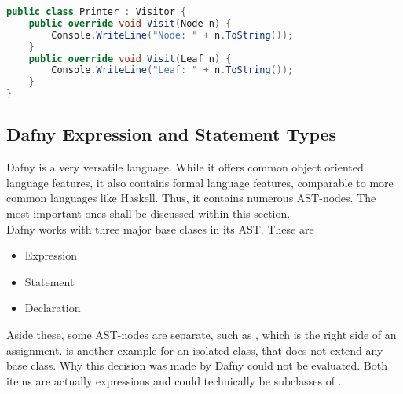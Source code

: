 \begin{lstlisting}[language=csharp, caption={Example for Visitor}, captionpos=b, label={lst:visitor}]
public class Printer : Visitor {
    public override void Visit(Node n) {
        Console.WriteLine("Node: " + n.ToString());
    }
    public override void Visit(Leaf n) {
        Console.WriteLine("Leaf: " + n.ToString());
    }
}
\end{lstlisting}

\subsection{Dafny Expression and Statement Types}
Dafny is a very versatile language. While it offers common object oriented language features, it also contains formal language features, comparable to more common languages like Haskell. Thus, it contains numerous AST-nodes. The most important ones shall be discussed within this section.\\

Dafny works with three major base clases in its AST. These are
\begin{itemize}
    \item Expression
    \item Statement
    \item Declaration
\end{itemize}
Aside these, some AST-nodes are separate, such as , which is the right side of an assignment.  is another example for an isolated class, that does not extend any base class. Why this decision was made by Dafny could not be evaluated. Both items are actually expressions and could technically be subclasses of .

